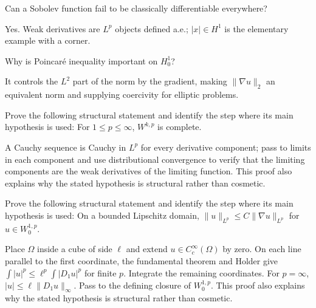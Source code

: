 \begin{problem}\label{prob:iii21-problem-07}
Can a Sobolev function fail to be classically differentiable everywhere?
\end{problem}
\begin{solution}
Yes. Weak derivatives are \(L^p\) objects defined a.e.; \(|x|\in H^1\) is
the elementary example with a corner.
\end{solution}

\begin{problem}\label{prob:iii21-problem-08}
Why is Poincaré inequality important on \(H_0^1\)?
\end{problem}
\begin{solution}
It controls the \(L^2\) part of the norm by the gradient, making
\(\|\nabla u\|_2\) an equivalent norm and supplying coercivity for elliptic
problems.
\end{solution}

\begin{problem}[Completeness of $W^{k,p}$]\label{prob:iii21-problem-09}
Prove the following structural statement and identify the step where its main hypothesis is used: For $1\le p\le\infty$, $W^{k,p}$ is complete.
\end{problem}
\begin{solution}
A Cauchy sequence is Cauchy in $L^p$ for every derivative component; pass to limits in each component and use distributional convergence to verify that the limiting components are the weak derivatives of the limiting function. This proof also explains why the stated hypothesis is structural rather than cosmetic.
\end{solution}

\begin{problem}\label{prob:iii21-problem-10}
Prove the following structural statement and identify the step where its main hypothesis is used: On a bounded Lipschitz domain, $\|u\|_{L^p}\le C\|\nabla u\|_{L^p}$ for $u\in W_0^{1,p}$.
\end{problem}
\begin{solution}
Place $\Omega$ inside a cube of side $\ell$ and extend $u\in C_c^\infty(\Omega)$ by zero. On each line parallel to the first coordinate, the fundamental theorem and Holder give $\int|u|^p\le\ell^p\int|D_1u|^p$ for finite $p$. Integrate the remaining coordinates. For $p=\infty$, $|u|\le\ell\|D_1u\|_\infty$. Pass to the defining closure of $W_0^{1,p}$. This proof also explains why the stated hypothesis is structural rather than cosmetic.
\end{solution}


